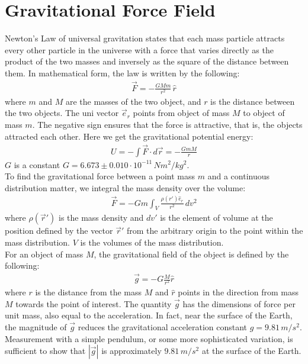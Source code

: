 \documentclass[11pt,oneside]{book}
\theoremstyle{break}
\theoremstyle{break}
\newcommand{\ee}[1]{\cdot 10^{#1}}
\begin{document}
\section[Gravitational Force Field]{\color{red} Gravitational Force Field\color{black}}
Newton's Law of universal gravitation states that each mass particle attracts every other particle in the universe with a force that varies directly as the product of the two masses and inversely as the square of the distance between them. In mathematical form, the law is written by the following:
\begin{align*}
\vec{F} = -\frac{GMm}{r^2}\, \hat{r}
\end{align*}
where $m$ and $M$ are the masses of the two object, and $r$ is the distance between the two objects. The uni vector $\vec{e}_r$ points from object of mass $M$ to object of mass $m$. The negative sign ensures that the force is attractive, that is, the objects attracted each other. Here we get the gravitational potential energy:
\begin{align*}
U = -\int \vec{F}\cdot d\vec{r} = -\frac{GmM}{r}
\end{align*}
$G$ is a constant $G = 6.673\pm 0.010 \ee{-11}\, Nm^2/kg^2$.\\
\hfill\break
To find the gravitational force between a point mass $m$ and a continuous distribution matter, we integral the mass density over the volume:
\begin{align*}
\vec{F} = -G m \int_V \frac{\rho(r')\hat{e}_r}{r^2}\, dv^2
\end{align*}
where $\rho(\vec{r}')$ is the mass density and $dv'$ is the element of volume at the position defined by the vector $\vec{r}'$ from the arbitrary origin to the point within the mass distribution. $V$ is the volumes of the mass distribution. \\

For an object of mass $M$, the gravitational field of the object is defined by the following:
\begin{align*}
\vec{g} = -G\frac{M}{r^2}\hat{r}
\end{align*}
where $r$ is the distance from the mass $M$ and $\hat{r}$ points in the direction from mass $M$ towards the point of interest. The quantity $\vec{g}$ has the dimensions of force per unit mass, also equal to the acceleration. In fact, near the surface of the Earth, the magnitude of $\vec{g}$ reduces the gravitational acceleration constant $g = 9.81\, m/s^2$. Measurement with a simple pendulum, or some more sophisticated variation, is sufficient to show that $|\vec{g}|$ is approximately $9.81\, m/s^2$ at the surface of the Earth.\\
\end{document}
